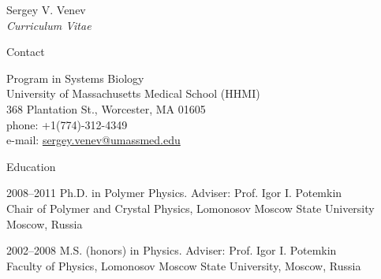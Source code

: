 \documentclass[10pt]{article}
\begin{document}




\newlength{\oldcvlabelwidth}
\renewcommand*{\cvbibname}{}

\begin{cv}{Sergey V. Venev\\{\large \itshape Curriculum Vitae}}

\begin{cvlist}{Contact}
    \item Program in Systems Biology\\
    University of Massachusetts Medical School (HHMI)\\
    368 Plantation St., Worcester, MA 01605\\
    phone: +1(774)-312-4349\\
    e-mail: \href{mailto:sergey.venev@umassmed.edu}{sergey.venev@umassmed.edu}
\end{cvlist}


\begin{cvlist}{Education}
    \item[2008--2011] Ph.D. in Polymer Physics. Adviser: Prof. Igor I. Potemkin\\
    Chair of Polymer and Crystal Physics, Lomonosov Moscow State University\\
    Moscow, Russia  
    \item[2002--2008] M.S. (honors) in Physics. Adviser: Prof. Igor I. Potemkin\\
    Faculty of Physics, Lomonosov Moscow State University,
    Moscow, Russia  
\end{cvlist}




\end{cv}
\end{document}
